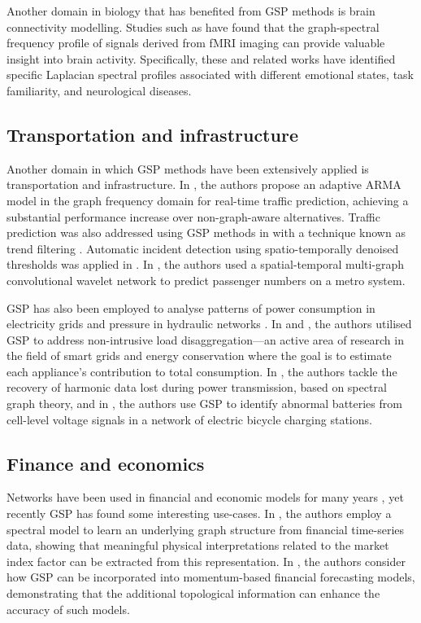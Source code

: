 Another domain in biology that has benefited from GSP methods is brain connectivity modelling. Studies such as \cite{Goldsberry2017,Atasoy2016,Menoret2017,Itani2021} have found that the graph-spectral frequency profile of signals derived from fMRI imaging can provide valuable insight into brain activity. Specifically, these and related works have identified specific Laplacian spectral profiles associated with different emotional states, task familiarity, and neurological diseases.

\subsection{Transportation and infrastructure}

Another domain in which GSP methods have been extensively applied is transportation and infrastructure. In \cite{Hasanzadeh2017}, the authors propose an adaptive ARMA model in the graph frequency domain for real-time traffic prediction, achieving a substantial performance increase over non-graph-aware alternatives. Traffic prediction was also addressed using GSP methods in \cite{Chakraborty2017} with a technique known as trend filtering \citep{Wang2016}. Automatic incident detection using spatio-temporally denoised thresholds was applied in \citep{Chakraborty2019}. In \cite{Xiu2022}, the authors used a spatial-temporal multi-graph convolutional wavelet network to predict passenger numbers on a metro system.

GSP has also been employed to analyse patterns of power consumption in electricity grids \citep{Ramakrishna2021} and pressure in hydraulic networks \citep{Zhou2022}. In \cite{He2018} and \cite{Zheng2022}, the authors utilised GSP to address non-intrusive load disaggregation—an active area of research in the field of smart grids and energy conservation where the goal is to estimate each appliance's contribution to total consumption. In \cite{Ying2022}, the authors tackle the recovery of harmonic data lost during power transmission, based on spectral graph theory, and in \cite{Wang2022b}, the authors use GSP to identify abnormal batteries from cell-level voltage signals in a network of electric bicycle charging stations.


\subsection{Finance and economics}

Networks have been used in financial and economic models for many years \citep{Marti2021}, yet recently GSP has found some interesting use-cases. In \cite{Vinicius2020}, the authors employ a spectral model to learn an underlying graph structure from financial time-series data, showing that meaningful physical interpretations related to the market index factor can be extracted from this representation. In \citep{Zhang2023}, the authors consider how GSP can be incorporated into momentum-based financial forecasting models, demonstrating that the additional topological information can enhance the accuracy of such models.

